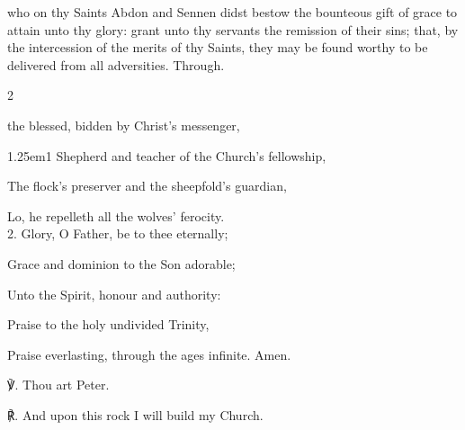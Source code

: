 \memorialCollect
{} who on thy Saints Abdon and Sennen didst bestow the bounteous gift of grace to attain unto thy glory: grant unto thy servants the remission of their sins; that, by the intercession of the merits of thy Saints, they may be found worthy to be delivered from all adversities. Through.


\vspace{-0.25\baselineskip}



\begin{paracol}{2}
\sloppy

\vspace{-1\baselineskip}

\firstEvensong
{}

\firstEvensongHymn
{} the blessed, bidden by Christ's messenger,


\begin{hangparas}{1.25em}{1}
Shepherd and teacher of  the Church’s fellowship,

The flock's preserver and the sheepfold's guardian,

Lo, he repelleth all the wolves’ ferocity.\\

2. Glory, O Father, be to thee eternally;

Grace and dominion to the Son adorable;

Unto the Spirit, honour and authority:

Praise to the holy undivided Trinity,

Praise everlasting, through the ages infinite. Amen.\\
\end{hangparas}

℣. Thou art Peter.

℟. And upon this rock I will build my Church.



\end{paracol}
